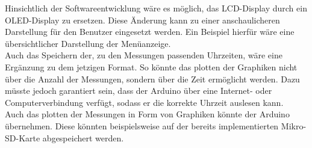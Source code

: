 \label{AusblickSW}

Hinsichtlich der Softwareentwicklung wäre es möglich, das \ac{LCD}-Display durch ein \ac{OLED}-Display zu ersetzen. Diese Änderung kann zu einer anschaulicheren Darstellung für den Benutzer eingesetzt werden. Ein Beispiel hierfür wäre eine übersichtlicher Darstellung der Menüanzeige. \\
Auch das Speichern der, zu den Messungen passenden Uhrzeiten, wäre eine Ergänzung zu dem jetzigen Format. So könnte das plotten der Graphiken nicht über die Anzahl der Messungen, sondern über die Zeit ermöglicht werden. Dazu müsste jedoch garantiert sein, dass der Arduino über eine Internet- oder Computerverbindung verfügt, sodass er die korrekte Uhrzeit auslesen kann. \\
Auch das plotten der Messungen in Form von Graphiken könnte der Arduino übernehmen. Diese könnten beispielsweise auf der bereits implementierten Mikro-SD-Karte abgespeichert werden.